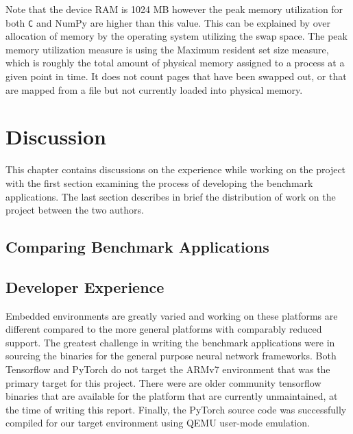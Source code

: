 Note that the device RAM is 1024 MB however the peak memory utilization for both \texttt{C} and NumPy are higher than this value. This can be explained by over allocation of memory by the operating system utilizing the swap space. The peak memory utilization measure is using the Maximum resident set size measure, which is roughly the total amount of physical memory assigned to a process at a given point in time. It does not count pages that have been swapped out, or that are mapped from a file but not currently loaded into physical memory.


\chapter{Discussion}

This chapter contains discussions on the experience while working on the project with the first section examining the process of developing the benchmark applications. The last section describes in brief the distribution of work on the project between the two authors.


\section{Comparing Benchmark Applications}


\section{Developer Experience}

Embedded environments are greatly varied and working on these platforms are different compared to the more general platforms with comparably reduced support. The greatest challenge in writing the benchmark applications were in sourcing the binaries for the general purpose neural network frameworks. Both Tensorflow and PyTorch do not target the ARMv7 environment that was the primary target for this project. There were are older community tensorflow binaries that are available for the platform that are currently unmaintained, at the time of writing this report. Finally, the PyTorch source code was successfully compiled for our target environment using QEMU user-mode emulation.

